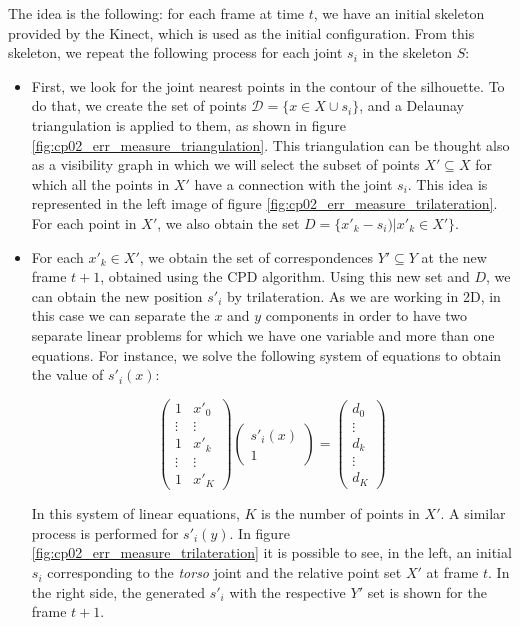 The idea is the following: for each frame at time $t$, we have an initial skeleton provided by the Kinect, which is used as the initial configuration. From this skeleton, we repeat the following process for each joint $s_i$ in the skeleton $S$:
\begin{itemize}
 \item First, we look for the joint nearest points in the contour of the silhouette. To do that, we create the set of points $\mathcal{D} = \{ x \in X \cup s_i \}$, and a Delaunay triangulation \citep{lingas1994linear} is applied to them, as shown in figure \ref{fig:cp02_err_measure_triangulation}. This triangulation can be thought also as a visibility graph in which we will select the subset of points $X' \subseteq X$ for which all the points in $X'$ have a connection with the joint $s_i$. This idea is represented in the left image of figure \ref{fig:cp02_err_measure_trilateration}. For each point in $X'$, we also obtain the set $D = \{ x'_k - s_i) | x'_k \in X' \} $.
 \item For each $x'_k \in X'$, we obtain the set of correspondences $Y' \subseteq Y$ at the new frame $t + 1$, 
obtained using the CPD algorithm. Using this new set and $D$, we can obtain the new position $s'_i$ by 
trilateration. As we are working in 2D, in this case we can separate the $x$ and $y$ components in order to have two 
separate linear problems for which we have one variable and more than one equations. For instance, we solve the following system of equations to obtain the value of $s'_i(x)$:
 
 \begin{equation}
  \left( \begin{array}{cc}
1 & x'_0 \\
\vdots & \vdots \\
1 & x'_k \\
\vdots & \vdots \\
1 & x'_K \end{array} \right)
  \left( \begin{array}{c}
s'_i(x) \\
1 \end{array} \right) = 
  \left( \begin{array}{cc}
d_0 \\
\vdots \\
d_k \\
\vdots \\
d_K \end{array} \right)
 \end{equation}
 
In this system of linear equations, $K$ is the number of points in $X'$. A similar process is performed for $s'_i(y)$. In 
figure \ref{fig:cp02_err_measure_trilateration} it is possible to see, in the left, an initial $s_i$ corresponding to the 
\textit{torso} joint and the relative point set $X'$ at frame $t$. In the right side, the generated $s'_i$ with the 
respective $Y'$ set is shown for the frame $t + 1$.
\end{itemize}

